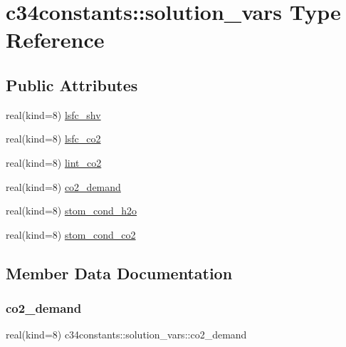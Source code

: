 \hypertarget{structc34constants_1_1solution__vars}{}\section{c34constants\+:\+:solution\+\_\+vars Type Reference}
\label{structc34constants_1_1solution__vars}
\subsection*{Public Attributes}
\begin{DoxyCompactItemize}
\item 
real(kind=8) \hyperlink{structc34constants_1_1solution__vars_a0df579a15ba37cb260c02e5e5006a898}{lsfc\+\_\+shv}
\item 
real(kind=8) \hyperlink{structc34constants_1_1solution__vars_ac883ed09e84e928780493e4964a66a7c}{lsfc\+\_\+co2}
\item 
real(kind=8) \hyperlink{structc34constants_1_1solution__vars_a02f4a98ac3084ca6df1289a9c5d98b5f}{lint\+\_\+co2}
\item 
real(kind=8) \hyperlink{structc34constants_1_1solution__vars_a76ff465202bc6670a65318d765d34a29}{co2\+\_\+demand}
\item 
real(kind=8) \hyperlink{structc34constants_1_1solution__vars_af8670de0f15d89016b814037183ece8e}{stom\+\_\+cond\+\_\+h2o}
\item 
real(kind=8) \hyperlink{structc34constants_1_1solution__vars_a0ff64b64e4fcc1416cb87b47a096d7a1}{stom\+\_\+cond\+\_\+co2}
\end{DoxyCompactItemize}


\subsection{Member Data Documentation}
\mbox{\label{structc34constants_1_1solution__vars_a76ff465202bc6670a65318d765d34a29}} 
\subsubsection{\texorpdfstring{co2\+\_\+demand}{co2\_demand}}
{\footnotesize\ttfamily real(kind=8) c34constants\+::solution\+\_\+vars\+::co2\+\_\+demand}

